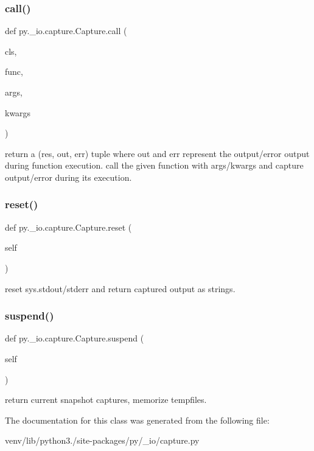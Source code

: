 \subsubsection{\texorpdfstring{call()}{call()}}
{\footnotesize\ttfamily def py.\+\_\+io.\+capture.\+Capture.\+call (\begin{DoxyParamCaption}\item[{}]{cls,  }\item[{}]{func,  }\item[{}]{args,  }\item[{}]{kwargs }\end{DoxyParamCaption})}

\begin{DoxyVerb}return a (res, out, err) tuple where
    out and err represent the output/error output
    during function execution.
    call the given function with args/kwargs
    and capture output/error during its execution.
\end{DoxyVerb}
 \mbox{\label{classpy_1_1__io_1_1capture_1_1_capture_a99e7e674860c89df28cf6e69f21d980b}} 
\subsubsection{\texorpdfstring{reset()}{reset()}}
{\footnotesize\ttfamily def py.\+\_\+io.\+capture.\+Capture.\+reset (\begin{DoxyParamCaption}\item[{}]{self }\end{DoxyParamCaption})}

\begin{DoxyVerb}reset sys.stdout/stderr and return captured output as strings. \end{DoxyVerb}
 \mbox{\label{classpy_1_1__io_1_1capture_1_1_capture_a132a04942f64cf541807c290ddedc644}} 
\subsubsection{\texorpdfstring{suspend()}{suspend()}}
{\footnotesize\ttfamily def py.\+\_\+io.\+capture.\+Capture.\+suspend (\begin{DoxyParamCaption}\item[{}]{self }\end{DoxyParamCaption})}

\begin{DoxyVerb}return current snapshot captures, memorize tempfiles. \end{DoxyVerb}
 

The documentation for this class was generated from the following file\+:\begin{DoxyCompactItemize}
\item 
venv/lib/python3./site-\/packages/py/\+\_\+io/capture.\+py\end{DoxyCompactItemize}
